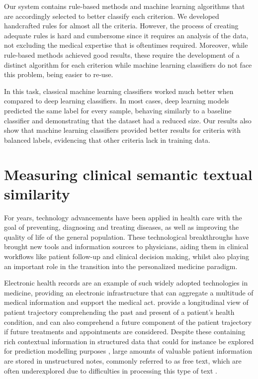 Our system contains rule-based methods and machine learning algorithms that are accordingly selected to better classify each criterion.
We developed handcrafted rules for almost all the criteria.
However, the process of creating adequate rules is hard and cumbersome since it requires an analysis of the data, not excluding the medical expertise that is oftentimes required.
Moreover, while rule-based methods achieved good results, these require the development of a distinct algorithm for each criterion while machine learning classifiers do not face this problem, being easier to re-use.

In this task, classical machine learning classifiers worked much better when compared to deep learning classifiers.
In most cases, deep learning models predicted the same label for every sample, behaving similarly to a baseline classifier and demonstrating that the dataset had a reduced size.
Our results also show that machine learning classifiers provided better results for criteria with balanced labels, evidencing that other criteria lack in training data.


\section{Measuring clinical semantic textual similarity}
\label{c4:s:clinical-sts}

For years, technology advancements have been applied in health care with the goal of preventing, diagnosing and treating diseases, as well as improving the quality of life of the general population.
These technological breakthroughs have brought new tools and information sources to physicians, aiding them in clinical workflows like patient follow-up and clinical decision making, whilst also playing an important role in the transition into the personalized medicine paradigm.

Electronic health records are an example of such widely adopted technologies in medicine, providing an electronic infrastructure that can aggregate a multitude of medical information and support the medical act.
 provide a longitudinal view of patient trajectory comprehending the past and present of a patient's health condition, and can also comprehend a future component of the patient trajectory if future treatments and appointments are considered.
Despite these containing rich contextual information in structured data that could for instance be explored for prediction modelling purposes \parencite{wu2010a,ferrao2013a,ferrao2016a}, large amounts of valuable patient information are stored in unstructured notes, commonly referred to as free text, which are often underexplored due to difficulties in processing this type of text \parencite{neustein2014a}.

